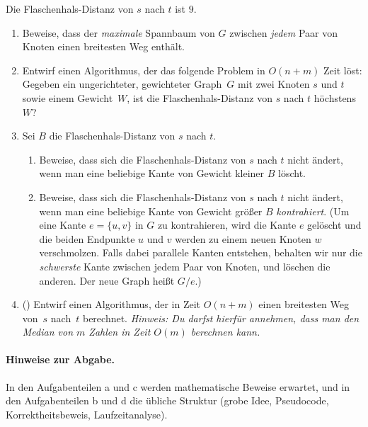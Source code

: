 \documentclass{uebung_cs}
\begin{document}
\begin{aufgabe}
\begin{center}
        \small Die Flaschenhals-Distanz von $s$ nach $t$ ist $9$.
  \end{center}
  \begin{enumerate}
      \item \mittel Beweise, dass der \emph{maximale} Spannbaum von $G$ zwischen \emph{jedem} Paar von Knoten einen breitesten Weg enthält.
      \item \mittel Entwirf einen Algorithmus, der das folgende Problem in $O(n+m)$ Zeit löst:
      Gegeben ein ungerichteter, gewichteter Graph~$G$ mit zwei Knoten $s$ und $t$ sowie einem Gewicht~$W$, ist die Flaschenhals-Distanz von $s$ nach $t$ höchstens $W$?
      \item \mittel Sei $B$ die Flaschenhals-Distanz von $s$ nach $t$.
        \begin{enumerate}[label=\roman*.]
            \item Beweise, dass sich die Flaschenhals-Distanz von $s$ nach $t$ nicht ändert, wenn man eine beliebige Kante von Gewicht kleiner $B$ löscht.
            \item Beweise, dass sich die Flaschenhals-Distanz von $s$ nach $t$ nicht ändert, wenn man eine beliebige Kante von Gewicht größer $B$ \emph{kontrahiert}.
            (Um eine Kante $e=\{u,v\}$ in $G$ zu kontrahieren, wird die Kante $e$ gelöscht und die beiden Endpunkte $u$ und $v$ werden zu einem neuen Knoten $w$ verschmolzen. Falls dabei parallele Kanten entstehen, behalten wir nur die 
            \emph{schwerste} Kante zwischen jedem Paar von Knoten, und löschen die anderen. Der neue Graph heißt $G/e$.)
        \end{enumerate}
    \item \note (\veryhard)
    Entwirf einen Algorithmus, der in Zeit $O(n+m)$ einen breitesten Weg von~$s$ nach~$t$ berechnet.
    \emph{Hinweis: Du darfst hierfür annehmen, dass man den Median von $m$ Zahlen in Zeit $O(m)$ berechnen kann.}
  \end{enumerate}
  
  \paragraph*{Hinweise zur Abgabe.}
  In den Aufgabenteilen a und c werden mathematische Beweise erwartet, und in den Aufgabenteilen b und d die übliche Struktur (grobe Idee, Pseudocode, Korrektheitsbeweis, Laufzeitanalyse).

\end{aufgabe}
\end{document}
